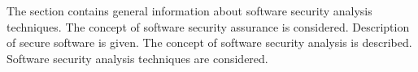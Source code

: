 %
%
The section contains general information about software security analysis techniques. 
%
The concept of software security assurance is considered. 
%
Description of secure software is given. 
%
The concept of software security analysis is described. 
%
Software security analysis techniques are considered. 